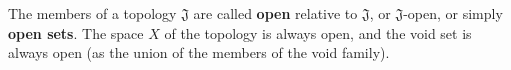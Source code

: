 The members of a topology $\mathfrak{J}$ are called \textbf{open} relative to $\mathfrak{J}$, or $\mathfrak{J}$-open, or simply \textbf{open sets}. The space $X$ of the topology is always open, and the void set is always open (as the union of the members of the void family).
